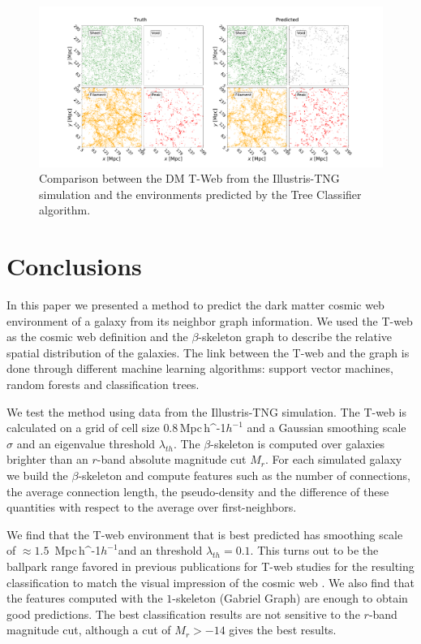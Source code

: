 \documentclass[usenatbib]{mnras}
\newcommand{\Mpch}{\,{\rm Mpc}\,\ifmmode h^{-1}\else $h^{-1}$\fi}
\begin{document}
\begin{figure}
  \centering 
    \includegraphics[scale=0.25]{Figs/p_environment_predicted.pdf}
    \caption{Comparison between the DM T-Web from the Illustris-TNG
      simulation and the environments predicted by the Tree Classifier
      algorithm.} 
    \label{fig:prediction}
\end{figure}


\section{Conclusions}\label{sec:conclusions}

In this paper we presented a method to predict the dark matter cosmic web
environment of a galaxy from its neighbor graph information.
We used the T-web as the cosmic web definition \citep{Forero-Romero2009}
and the $\beta$-skeleton graph \citep{Fang2019} 
to describe the relative spatial distribution of the galaxies. 
The link between the T-web and the graph is done through different
machine learning algorithms: support vector machines, random forests and
classification trees.

We test the method using data from the Illustris-TNG simulation.
The T-web is calculated on a grid of cell size $0.8$\Mpch 
and a Gaussian smoothing scale $\sigma$ and an eigenvalue threshold $\lambda_{th}$.
The $\beta$-skeleton is computed over galaxies brighter than 
an $r$-band absolute magnitude cut $M_{r}$.
For each simulated galaxy we build the $\beta$-skeleton and
compute features such as the number of connections, the average connection
length, the pseudo-density and the difference of these quantities with
respect to the average over first-neighbors.

We find that the T-web environment that is best predicted has smoothing
scale of $\approx1.5$ \Mpch and an threshold $\lambda_{th}=0.1$. 
This turns out to be the ballpark range favored in previous publications
for T-web  studies for the resulting classification to match the visual impression of the cosmic web \citep{Forero-Romero2009}.
We also find that the features computed with the $1$-skeleton 
(Gabriel Graph) are enough to obtain good predictions. 
The best classification results are not sensitive to the $r$-band
magnitude cut, although a cut of $M_r>-14$ gives the best results.
\end{document}
